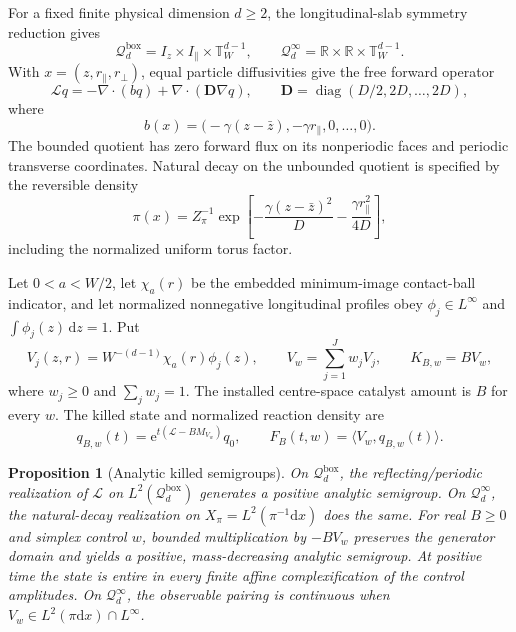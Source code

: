 \documentclass{iopjournal}
\newcommand{\dd}{\mathrm d}
\newcommand{\e}{\mathrm e}
\newcommand{\Lfree}{\mathcal L}
\newcommand{\Qbox}{\mathcal Q_d^{\mathrm{box}}}
\newcommand{\Qinf}{\mathcal Q_d^{\infty}}
\theoremstyle{plain}
\newtheorem{proposition}[theorem]{Proposition}
\theoremstyle{definition}
\begin{document}
For a fixed finite physical dimension \(d\ge2\), the longitudinal-slab
symmetry reduction gives
\begin{equation}
 \Qbox=I_z\times I_\parallel\times\mathbb T_W^{d-1},
 \qquad
 \Qinf=\mathbb R\times\mathbb R\times\mathbb T_W^{d-1}.
 \label{eq:supp-domains}
\end{equation}
With \(x=(z,r_\parallel,r_\perp)\), equal particle diffusivities give the free
forward operator
\begin{equation}
 \Lfree q=-\nabla\!\cdot(bq)+\nabla\!\cdot(\bm D\nabla q),
 \qquad
 \bm D=\operatorname{diag}(D/2,2D,\ldots,2D),
 \label{eq:supp-free-generator}
\end{equation}
where
\begin{equation}
 b(x)=\bigl(-\gamma(z-\bar z),-\gamma r_\parallel,0,\ldots,0\bigr).
 \label{eq:supp-drift}
\end{equation}
The bounded quotient has zero forward flux on its nonperiodic faces and
periodic transverse coordinates.  Natural decay on the unbounded quotient is
specified by the reversible density
\begin{equation}
 \pi(x)=Z_\pi^{-1}
 \exp\!\left[-\frac{\gamma(z-\bar z)^2}{D}
              -\frac{\gamma r_\parallel^2}{4D}\right],
 \label{eq:supp-pi}
\end{equation}
including the normalized uniform torus factor.

Let \(0<a<W/2\), let \(\chi_a(r)\) be the embedded minimum-image contact-ball
indicator, and let normalized nonnegative longitudinal profiles obey
\(\phi_j\in L^\infty\) and \(\int\phi_j(z)\,\dd z=1\).  Put
\begin{equation}
 V_j(z,r)=W^{-(d-1)}\chi_a(r)\phi_j(z),\qquad
 V_w=\sum_{j=1}^Jw_jV_j,\qquad K_{B,w}=BV_w,
 \label{eq:supp-profiles}
\end{equation}
where \(w_j\ge0\) and \(\sum_jw_j=1\).  The installed centre-space catalyst
amount is \(B\) for every \(w\).  The killed state and normalized reaction
density are
\begin{equation}
 q_{B,w}(t)=\e^{t(\Lfree-BM_{V_w})}q_0,\qquad
 F_B(t,w)=\langle V_w,q_{B,w}(t)\rangle .
 \label{eq:supp-state}
\end{equation}

\begin{proposition}[Analytic killed semigroups]
\label{prop:supp-analytic}
On \(\Qbox\), the reflecting/periodic realization of \(\Lfree\) on
\(L^2(\Qbox)\) generates a positive analytic semigroup.  On \(\Qinf\), the
natural-decay realization on \(X_\pi=L^2(\pi^{-1}\dd x)\) does the same.
For real \(B\ge0\) and simplex control \(w\), bounded multiplication by
\(-BV_w\) preserves the generator domain and yields a positive,
mass-decreasing analytic semigroup.  At positive time the state is entire in
every finite affine complexification of the control amplitudes.  On
\(\Qinf\), the observable pairing is continuous when
\(V_w\in L^2(\pi\dd x)\cap L^\infty\).
\end{proposition}
\end{document}
